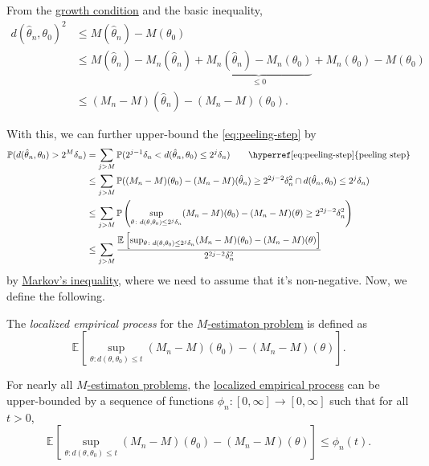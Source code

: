 \begin{note}
	From the \hyperref[def:growth-condition*]{growth condition} and the basic inequality,
	\[
		\begin{split}
			d(\hat{\theta} _n, \theta _0)^2
			&\leq M(\hat{\theta} _n ) - M(\theta _0)\\
			&\leq M(\hat{\theta} _n) - M_n(\hat{\theta} _n) + \underbrace{M_n(\hat{\theta} _n) - M_n(\theta _0)}_{\leq 0} + M_n(\theta _0) - M(\theta _0)\\
			&\leq (M_n - M)(\hat{\theta} _n) - (M_n - M)(\theta _0).
		\end{split}
	\]
\end{note}

With this, we can further upper-bound the \autoref{eq:peeling-step} by
\begin{align*}
	\mathbb{P} (d(\hat{\theta} _n, \theta _0) > 2^M \delta _n)
	 & = \sum_{j > M} \mathbb{P} (2^{j-1} \delta _n < d(\hat{\theta} _n, \theta _0) \leq 2^j \delta _n)\tag*{\hyperref[eq:peeling-step]{peeling step}}                                        \\
	 & \leq \sum_{j > M} \mathbb{P} ((M_n - M)(\theta _0) - (M_n - M)(\hat{\theta} _n) \geq 2^{2j-2} \delta _n^2 \cap d(\hat{\theta} _n, \theta _0) \leq 2^j \delta _n)                       \\
	 & \leq \sum_{j > M} \mathbb{P} \left( \sup _{\theta \colon d(\theta , \theta _0) \leq 2^j \delta _n} (M_n - M)(\theta _0) - (M_n - M)(\theta ) \geq 2^{2j - 2} \delta _n^2 \right)       \\
	 & \leq \sum_{j > M} \frac{\mathbb{E}_{}\left[\sup _{\theta \colon d(\theta , \theta _0) \leq 2^j \delta _n} (M_n - M)(\theta _0) - (M_n - M)(\theta ) \right] }{2^{2j - 2} \delta _n^2 }
\end{align*}
by \hyperref[lma:Markov-inequality]{Markov's  inequality}, where we need to assume that it's non-negative. Now, we define the following.

\begin{definition}\label{def:localized-EP}
	The \emph{localized empirical process} for the \hyperref[prb:M-estimation]{\(M\)-estimaton problem} is defined as
	\[
		\mathbb{E}_{}\left[\sup _{\theta \colon d(\theta , \theta _0) \leq t} (M_n - M)(\theta _0) - (M_n - M)(\theta ) \right].
	\]
\end{definition}

\begin{note}
	For nearly all \hyperref[prb:M-estimation]{\(M\)-estimaton problems}, the \hyperref[def:localized-EP]{localized empirical process} can be upper-bounded by a sequence of functions \(\phi _n\colon [0, \infty ] \to [0, \infty ]\) such that for all \(t > 0\),
	\[
		\mathbb{E}_{}\left[\sup _{\theta \colon d(\theta , \theta _0) \leq t} (M_n - M)(\theta _0) - (M_n - M)(\theta ) \right] \leq \phi _n(t).
	\]
\end{note}

